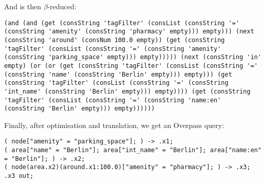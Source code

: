 \documentclass[main.tex]{subfiles}
\begin{document}
And is then $\beta$-reduced:
\begin{lstlisting}
(and (and (get (consString 'tagFilter' (consList (consString '=' (consString 'amenity' (consString 'pharmacy' empty))) empty))) (next (consString 'around' (consNum 100.0 empty)) (get (consString 'tagFilter' (consList (consString '=' (consString 'amenity' (consString 'parking_space' empty))) empty))))) (next (consString 'in' empty) (or (or (get (consString 'tagFilter' (consList (consString '=' (consString 'name' (consString 'Berlin' empty))) empty))) (get (consString 'tagFilter' (consList (consString '=' (consString 'int_name' (consString 'Berlin' empty))) empty)))) (get (consString 'tagFilter' (consList (consString '=' (consString 'name:en' (consString 'Berlin' empty))) empty))))))
\end{lstlisting}

Finally, after optimisation and translation, we get an Overpass query:
\begin{lstlisting}
( node["amenity" = "parking_space"]; ) -> .x1;
( area["name" = "Berlin"]; area["int_name" = "Berlin"]; area["name:en" = "Berlin"]; ) -> .x2;
( node(area.x2)(around.x1:100.0)["amenity" = "pharmacy"]; ) -> .x3;
.x3 out;
\end{lstlisting}
\end{document}

